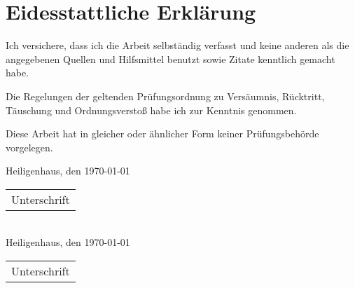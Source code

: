 \section*{Eidesstattliche Erklärung}
%
Ich versichere, dass ich die Arbeit selbständig verfasst und keine anderen als die angegebenen Quellen und Hilfsmittel benutzt sowie Zitate kenntlich gemacht habe.
%
\bigskip

Die Regelungen der geltenden Prüfungsordnung zu Versäumnis, Rücktritt, Täuschung und Ordnungsverstoß habe ich zur Kenntnis genommen.
%
\bigskip

Diese Arbeit hat in gleicher oder ähnlicher Form keiner Prüfungsbehörde vorgelegen.
%
\bigskip

%

\bigskip
\vspace{3cm}
Heiligenhaus, den \today
\hfill
\begin{tabular}[t]{@{}l@{}}\hline
\hspace*{2.5cm}Unterschrift\hspace*{2.5cm}
\end{tabular}
\bigskip
\vspace{2cm}\\
Heiligenhaus, den \today
\hfill
\begin{tabular}[t]{@{}l@{}}\hline
\hspace*{2.5cm}Unterschrift\hspace*{2.5cm}
\end{tabular}